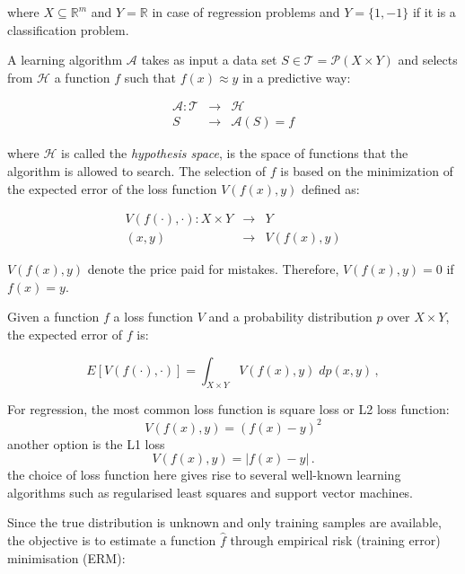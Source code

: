 \noindent where $X \subseteq \mathbb{R}^m$ and $Y = \mathbb{R}$ in case of regression problems and $Y = \{1,-1\}$  if it is a classification problem. 

A learning algorithm $\mathcal{A}$ takes as input a data set $S \in \mathscr{T}=\mathscr{P}(X\times Y)$ and selects from $\mathcal{H}$ a function $f$ such that $f(x)\approx y $ in a predictive way:

\begin{eqnarray*}
\mathcal{A}: \mathscr{T} &\rightarrow & \mathcal{H} \\
S &\rightarrow &\mathcal{A}(S) = f
\end{eqnarray*}

\noindent where $\mathcal{H}$ is called the {\em hypothesis space}, is the space of functions that the algorithm is allowed to search. The selection of $f$ is based on the minimization of the expected error of the loss function $V(f(x),y)$ defined as:

\begin{eqnarray*}
 V(f(\cdot),\cdot): X\times Y &\rightarrow & Y \\
  (x, y) &\rightarrow &V(f(x),y)
\end{eqnarray*}

\noindent $V(f(x),y)$ denote the price paid for mistakes. Therefore, $V(f(x),y)=0$ if $f(x)=y$.

Given a function $f$ a loss function $V$ and a probability distribution $p$ over $X \times Y$, the expected error of $f$ is:

\begin{equation}
\label{eq:expetedrisk}
E[V(f(\cdot),\cdot)] = \int_{X\times Y} V(f(x),y)\;dp(x,y)\,,
\end{equation}


For regression, the most common loss function is square loss or L2 loss function:
\begin{equation}
\label{eq:l2loss}
V(f(x),y) = (f(x)-y)^2
\end{equation}
\noindent another option is the L1 loss
\begin{equation}
\label{eq:l1loss}
V(f(x),y) = |f(x)-y| \, .
\end{equation}
\noindent the choice of loss function here gives rise to several well-known learning algorithms such as regularised least squares and support vector machines. %

Since the true distribution is unknown and only training samples are available, the objective is to estimate a function $\hat{f}$ through empirical risk (training error) minimisation (ERM): 

